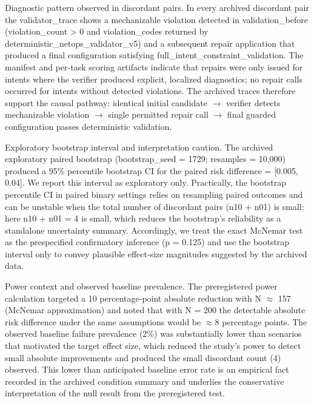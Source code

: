 \documentclass[conference]{IEEEtran}
\begin{document}
Diagnostic pattern observed in discordant pairs. In every archived discordant pair the validator\_trace shows a mechanizable violation detected in validation\_before (violation\_count > 0 and violation\_codes returned by deterministic\_netops\_validator\_v5) and a subsequent repair application that produced a final configuration satisfying full\_intent\_constraint\_validation. The manifest and per‑task scoring artifacts indicate that repairs were only issued for intents where the verifier produced explicit, localized diagnostics; no repair calls occurred for intents without detected violations. The archived traces therefore support the causal pathway: identical initial candidate \ensuremath{\rightarrow} verifier detects mechanizable violation \ensuremath{\rightarrow} single permitted repair call \ensuremath{\rightarrow} final guarded configuration passes deterministic validation.

Exploratory bootstrap interval and interpretation caution. The archived exploratory paired bootstrap (bootstrap\_seed = 1729; resamples = 10,000) produced a 95\% percentile bootstrap CI for the paired risk difference = [0.005, 0.04]. We report this interval as exploratory only. Practically, the bootstrap percentile CI in paired binary settings relies on resampling paired outcomes and can be unstable when the total number of discordant pairs (n10 + n01) is small; here n10 + n01 = 4 is small, which reduces the bootstrap's reliability as a standalone uncertainty summary. Accordingly, we treat the exact McNemar test as the prespecified confirmatory inference (p = 0.125) and use the bootstrap interval only to convey plausible effect‑size magnitudes suggested by the archived data.

Power context and observed baseline prevalence. The preregistered power calculation targeted a 10 percentage‑point absolute reduction with N \ensuremath{\approx} 157 (McNemar approximation) and noted that with N = 200 the detectable absolute risk difference under the same assumptions would be \ensuremath{\approx}8 percentage points. The observed baseline failure prevalence (2\%) was substantially lower than scenarios that motivated the target effect size, which reduced the study's power to detect small absolute improvements and produced the small discordant count (4) observed. This lower than anticipated baseline error rate is an empirical fact recorded in the archived condition summary and underlies the conservative interpretation of the null result from the preregistered test.
\end{document}
